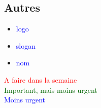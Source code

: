 \documentclass[10pt,a4paper]{report}
\begin{document}
\subsection*{Autres}
\begin{itemize}
        \item \textcolor{blue}{logo}
        \item \textcolor{blue}{slogan}
        \item \textcolor{blue}{nom}
\end{itemize}

\textcolor{red}{A faire dans la semaine} \\
\textcolor{darkgreen}{Important, mais moins urgent} \\
\textcolor{blue}{Moins urgent}
\end{document}
